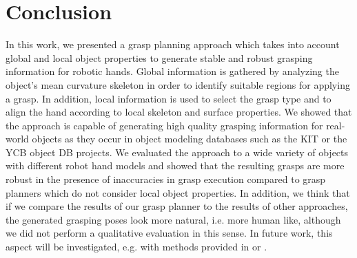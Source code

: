 \vspace{-0.1cm}

\section{Conclusion}

In this work, we presented a grasp planning approach which takes into account global and local object properties to generate stable and robust grasping information for robotic hands. Global information is gathered by analyzing the object's mean curvature skeleton in order to identify suitable regions for applying a grasp. In addition, local information is used to select the grasp type and to align the hand according to local skeleton and surface properties. 
We showed that the approach is capable of generating high quality grasping information for real-world objects as they occur in object modeling databases such as the KIT or the YCB object DB projects.
We evaluated the approach to a wide variety of objects with different robot hand models and showed that the resulting grasps are more robust in the presence of inaccuracies in grasp execution compared to grasp planners which do not consider local object properties.
In addition, we think that if we compare the results of our grasp planner to the results of other approaches, the generated grasping poses look more natural, i.e. more human like, although we did not perform a qualitative evaluation in this sense. In future work, this aspect will be investigated, e.g. with methods provided in \cite{Borst2005} or \cite{Liarokapis2015}.